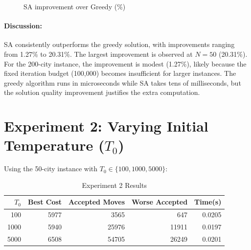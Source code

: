 \documentclass[12pt,a4paper]{article}
\begin{document}
\begin{figure}[H]
\centering
{}
\caption{SA improvement over Greedy (\%)}
\end{figure}

\paragraph{Discussion:}
SA consistently outperforms the greedy solution, with improvements ranging from 1.27\% to 20.31\%. The largest improvement is observed at $N=50$ (20.31\%). For the 200-city instance, the improvement is modest (1.27\%), likely because the fixed iteration budget (100{,}000) becomes insufficient for larger instances. The greedy algorithm runs in microseconds while SA takes tens of milliseconds, but the solution quality improvement justifies the extra computation.

\section{Experiment 2: Varying Initial Temperature ($T_0$)}

Using the 50-city instance with $T_0 \in \{100, 1000, 5000\}$:

\begin{table}[H]
\centering
\caption{Experiment 2 Results}
\begin{tabular}{@{}rrrrr@{}}
\toprule
\textbf{$T_0$} & \textbf{Best Cost} & \textbf{Accepted Moves} & \textbf{Worse Accepted} & \textbf{Time(s)} \\
\midrule
100 & 5977 & 3565 & 647 & 0.0205 \\
1000 & 5940 & 25976 & 11911 & 0.0197 \\
5000 & 6508 & 54705 & 26249 & 0.0201 \\
\bottomrule
\end{tabular}
\end{table}
\end{document}
